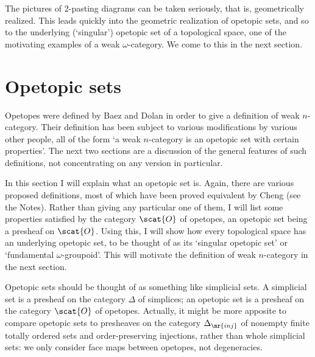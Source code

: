 The pictures of 2-pasting diagrams can be taken seriously, that is,
geometrically realized.  This leads quickly into the geometric realization
of opetopic sets, and so to the underlying (`singular') opetopic set of a
topological space, one of the motivating examples of a weak
$\omega$-category.  We come to this in the next section.%
%
%







\section{Opetopic sets}

Opetopes were defined by Baez and Dolan in order to give a definition of
weak $n$-category.  Their definition
has been subject to various
modifications by various other people, all of the form `a weak $n$-category
is an opetopic set with certain properties'.  The next two sections are a
discussion of the general features of such definitions, not concentrating
on any version in particular.

In this section I will explain what an opetopic set is.  Again, there are
various proposed definitions,%
%
%
most of which have been proved equivalent by
Cheng%
%
%
(see the Notes).  Rather than giving any particular one of them, I
will list some properties satisfied by the category $\scat{O}$%
% 
%
%
% 
of opetopes,
an opetopic set being a presheaf on $\scat{O}$.  Using this, I will show
how every topological space has an underlying opetopic set, to be thought
of as its `singular opetopic set' or `fundamental $\omega$-groupoid'.  This
will motivate the definition of weak $n$-category in the next section.

Opetopic sets should be thought of as something like simplicial sets.  A
simplicial set is a presheaf on the category $\Delta$ of simplices; an
opetopic set is a presheaf on the category $\scat{O}$ of opetopes.
Actually, it might be more apposite to compare opetopic sets to presheaves
on the category $\Delta_\mr{inj}$%
% 
% 
of nonempty finite totally ordered sets
and order-preserving injections, rather than whole simplicial sets: we only
consider face%
%
%
maps between opetopes, not degeneracies.%
%
%

